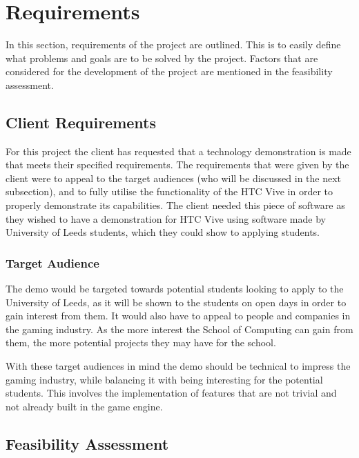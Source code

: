 \chapter{Requirements}
\label{chapter3}

In this section, requirements of the project are outlined. This is to easily define what problems and goals are to be solved by the project. Factors that are considered for the development of the project are mentioned in the feasibility assessment.

\section{Client Requirements}

For this project the client has requested that a technology demonstration is made that meets their specified requirements. The requirements that were given by the client were to appeal to the target audiences (who will be discussed in the next subsection), and to fully utilise the functionality of the HTC Vive in order to properly demonstrate its capabilities. The client needed this piece of software as they wished to have a demonstration for HTC Vive using software made by University of Leeds students, which they could show to applying students.

\subsection{Target Audience}
The demo would be targeted towards potential students looking to apply to the University of Leeds, as it will be shown to the students on open days in order to gain interest from them.
It would also have to appeal to people and companies in the gaming industry. As the more interest the School of Computing can gain from them, the more potential projects they may have for the school.
\newline
\par
With these target audiences in mind the demo should be technical to impress the gaming industry, while balancing it with being interesting for the potential students. This involves the implementation of features that are not trivial and not already built in the game engine.

\section{Feasibility Assessment}
